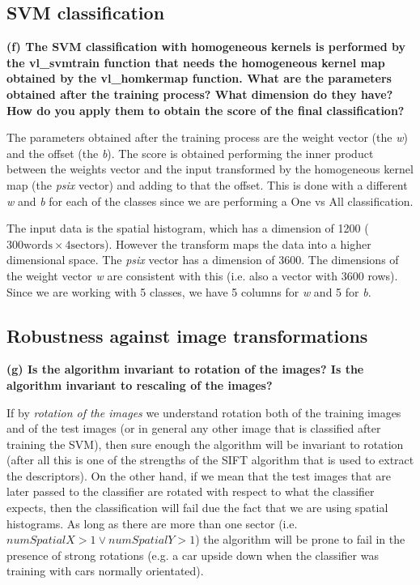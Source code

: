 \subsection{SVM classification}

{\bfseries (f) The SVM classification with homogeneous kernels is performed by the vl\_svmtrain function that needs the homogeneous kernel map obtained by the vl\_homkermap function. What are the parameters obtained after the training process? What dimension do they have? How do you apply them to obtain the score of the final classification?}

The parameters obtained after the training process are the weight vector (the \emph{w}) and the offset (the \emph{b}). The score is obtained performing the inner product between the weights vector and the input transformed by the homogeneous kernel map (the \emph{psix} vector) and adding to that the offset. This is done with a different \emph{w} and \emph{b} for each of the classes since we are performing a One vs All classification.

The input data is the spatial histogram, which has a dimension of 1200 ($ 300 \mathrm{words} \times 4 \mathrm{sectors} $). However the transform maps the data into a higher dimensional space. The \emph{psix} vector has a dimension of 3600. The dimensions of the weight vector \emph{w} are consistent with this (i.e. also a vector with 3600 rows). Since we are working with 5 classes, we have 5 columns for \emph{w} and 5 for \emph{b}.

\subsection{Robustness against image transformations}

{\bfseries (g) Is the algorithm invariant to rotation of the images? Is the algorithm invariant to rescaling of the images?}

If by \emph{rotation of the images} we understand rotation both of the training images and of the test images (or in general any other image that is classified after training the SVM), then sure enough the algorithm will be invariant to rotation (after all this is one of the strengths of the SIFT algorithm that is used to extract the descriptors). On the other hand, if we mean that the test images that are later passed to the classifier are rotated with respect to what the classifier expects, then the classification will fail due the fact that we are using spatial histograms. As long as there are more than one sector (i.e. $ numSpatialX > 1 \lor numSpatialY > 1 $) the algorithm will be prone to fail in the presence of strong rotations (e.g. a car upside down when the classifier was training with cars normally orientated).

